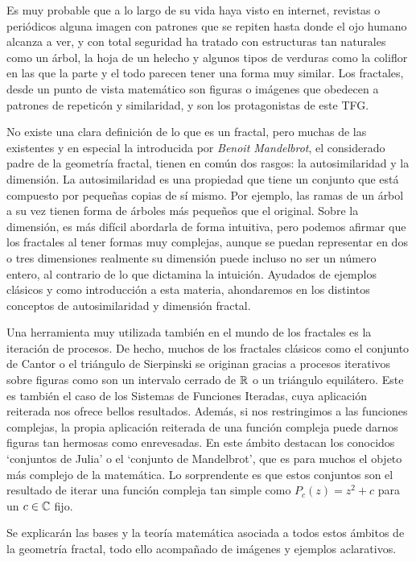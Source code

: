 
Es muy probable que a lo largo de su vida haya visto en internet, revistas o periódicos alguna imagen con patrones que se repiten hasta donde el ojo humano alcanza a ver, y con total seguridad ha tratado con estructuras tan naturales como un árbol, la hoja de un helecho y algunos tipos de verduras como la coliflor en las que la parte y el todo parecen tener una forma muy similar. Los fractales, desde un punto de vista matemático son figuras o imágenes que obedecen a patrones de repeticón y similaridad, y son los protagonistas de este TFG.

No existe una clara definición de lo que es un fractal, pero muchas de las existentes y en especial la introducida por \textit{Benoit Mandelbrot}, el considerado padre de la geometría fractal, tienen en común dos rasgos: la autosimilaridad y la dimensión. La autosimilaridad es una propiedad que tiene un conjunto que está compuesto por pequeñas copias de sí mismo. Por ejemplo, las ramas de un árbol a su vez tienen forma de árboles más pequeños que el original. Sobre la dimensión, es más difícil abordarla de forma intuitiva, pero podemos afirmar que los fractales al tener formas muy complejas, aunque se puedan representar en dos o tres dimensiones realmente su dimensión puede incluso no ser un número entero, al contrario de lo que dictamina la intuición. Ayudados de ejemplos clásicos y como introducción a esta materia, ahondaremos en los distintos conceptos de autosimilaridad y dimensión fractal.

Una herramienta muy utilizada también en el mundo de los fractales es la iteración de procesos. De hecho, muchos de los fractales clásicos como el conjunto de Cantor o el triángulo de Sierpinski se originan gracias a procesos iterativos sobre figuras como son un intervalo cerrado de $\mathbb{R}$ o un triángulo equilátero. Este es también el caso de los Sistemas de Funciones Iteradas, cuya aplicación reiterada nos ofrece bellos resultados. Además, si nos restringimos a las funciones complejas, la propia aplicación reiterada de una función compleja puede darnos figuras tan hermosas como enrevesadas. En este ámbito destacan los conocidos `conjuntos de Julia' o el `conjunto de Mandelbrot', que es para muchos el objeto más complejo de la matemática. Lo sorprendente es que estos conjuntos son el resultado de iterar una función compleja tan simple como $P_c(z)=z^2+c$ para un $c\in\mathbb{C}$ fijo. 

Se explicarán las bases y la teoría matemática asociada a todos estos ámbitos de la geometría fractal, todo ello acompañado de imágenes y ejemplos aclarativos.


